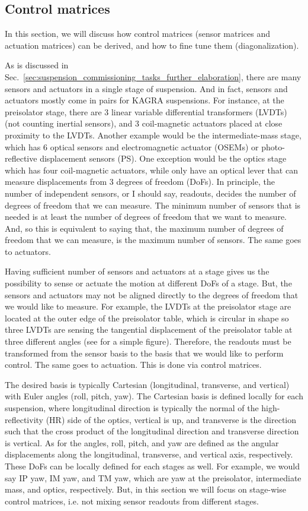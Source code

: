 \subsection{Control matrices}
In this section, we will discuss how control matrices (sensor matrices and actuation matrices) can be derived, and how to fine tune them (diagonalization).

As is discussed in Sec.~\ref{sec:suspension_commissioning_tasks_further_elaboration}, there are many sensors and actuators in a single stage of suspension.
And in fact, sensors and actuators mostly come in pairs for KAGRA suspensions.
For instance, at the preisolator stage, there are 3 linear variable differential transformers (LVDTs) (not counting inertial sensors), and 3 coil-magnetic actuators placed at close proximity to the LVDTs.
Another example would be the intermediate-mass stage, which has 6 optical sensors and electromagnetic actuator (OSEMs) or photo-reflective displacement sensors (PS).
One exception would be the optics stage which has four coil-magnetic actuators, while only have an optical lever that can measure displacements from 3 degrees of freedom (DoFs).
In principle, the number of independent sensors, or I should say, readouts, decides the number of degrees of freedom that we can measure.
The minimum number of sensors that is needed is at least the number of degrees of freedom that we want to measure.
And, so this is equivalent to saying that, the maximum number of degrees of freedom that we can measure, is the maximum number of sensors.
The same goes to actuators.

Having sufficient number of sensors and actuators at a stage gives us the possibility to sense or actuate the motion at different DoFs of a stage.
But, the sensors and actuators may not be aligned directly to the degrees of freedom that we would like to measure.
For example, the LVDTs at the preisolator stage are located at the outer edge of the preisolator table, which is circular in shape so three LVDTs are sensing the tangential displacement of the preisolator table at three different angles (see \cite{all_of_the_vibration} for a simple figure).
Therefore, the readouts must be transformed from the sensor basis to the basis that we would like to perform control.
The same goes to actuation.
This is done via control matrices.

The desired basis is typically Cartesian (longitudinal, transverse, and vertical) with Euler angles (roll, pitch, yaw).
The Cartesian basis is defined locally for each suspension, where longitudinal direction is typically the normal of the high-reflectivity (HR) side of the optics, vertical is up, and transverse is the direction such that the cross product of the longitudinal direction and transverse direction is vertical.
As for the angles, roll, pitch, and yaw are defined as the angular displacements along the longitudinal, transverse, and vertical axis, respectively.
These DoFs can be locally defined for each stages as well.
For example, we would say IP yaw, IM yaw, and TM yaw, which are yaw at the preisolator, intermediate mass, and optics, respectively.
But, in this section we will focus on stage-wise control matrices, i.e. not mixing sensor readouts from different stages.

